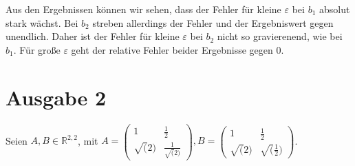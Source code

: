 \documentclass[11pt,a4paper,ngerman]{article}
\begin{document}
\begin{description}
Aus den Ergebnissen können wir sehen, dass der Fehler für kleine $\varepsilon$ bei $b_1$ absolut stark wächst. Bei $b_2$ streben allerdings der Fehler und der Ergebniswert gegen unendlich. Daher ist der Fehler für kleine $\varepsilon$ bei $b_2$ nicht so gravierenend, wie bei $b_1$. Für große $\varepsilon$ geht der relative Fehler beider Ergebnisse gegen 0.
\end{description}

\pagebreak


\section*{Ausgabe 2}

Seien $A,B \in \mathbb{R}^{2,2}$, mit
$ A = \left(
        \begin{array}{cc}
          1         & \frac{1}{2} \\
          \sqrt(2)  & \frac{1}{\sqrt(2)}
        \end{array}
      \right),
 B = \left(
        \begin{array}{cc}
          1         & \frac{1}{2} \\
          \sqrt(2)  & \sqrt(\frac{1}{2})
        \end{array}
      \right)
$.
\end{document}
